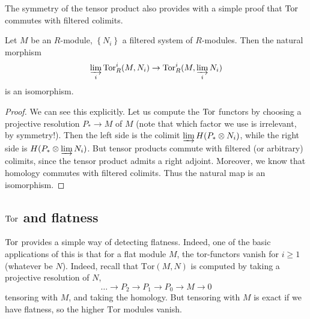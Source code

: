 The symmetry of the tensor product also provides with a simple proof that
$\operatorname{Tor}$ commutes with filtered colimits. 
\begin{proposition} \label{torfilteredcolim}
Let $M$ be an $R$-module, $\left\{N_i\right\}$ a filtered system of
$R$-modules. Then the natural morphism
\[  \varinjlim_i \operatorname{Tor}_R^i(M, N_i) \to \operatorname{Tor}^i_R(M, \varinjlim_i N_i)   \]
is an isomorphism.
\end{proposition} 
\begin{proof} 
We can see this explicitly. Let us compute the $\operatorname{Tor}$ functors by choosing a
projective resolution $P_* \to M$ of $M$ (note that which factor we use is irrelevant, by
symmetry!). Then the left side is the colimit
\( \varinjlim H(P_* \otimes N_i)  \), while the right side is $H(P_* \otimes
\varinjlim N_i)$. But tensor products commute with filtered (or arbitrary)
colimits, since the tensor product admits a right adjoint. Moreover, we know
that homology commutes with filtered colimits. Thus the natural map is an
isomorphism.
\end{proof} 


\subsection{$\operatorname{Tor}$ and flatness}

$\operatorname{Tor}$ provides a simple way of detecting flatness. Indeed, one of the basic applications of this is that for a flat module $M$, the tor-functors vanish for $i \geq 1$ (whatever be $N$).
Indeed, recall that $\mathrm{Tor} (M,N)$ is computed by taking a projective resolution of $N$,
\[ \dots \to P_2 \to P_1 \to P_0 \to M \to 0 \]
tensoring with $M$, and taking the homology.  But tensoring with $M$ is exact if we have flatness, so the higher $\mathrm{Tor} $ modules vanish.

